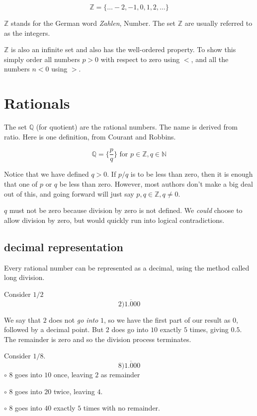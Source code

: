 \documentclass[11pt, oneside]{article}
\begin{document}
\[ \mathbb{Z} = \{ \dots -2, -1, 0, 1, 2, \dots \} \]

$\mathbb{Z}$ stands for the German word \emph{Zahlen}, Number.  The set $\mathbb{Z}$ are usually referred to as the integers.

$\mathbb{Z}$ is also an infinite set and also has the well-ordered property.  To show this simply order all numbers $p > 0$ with respect to zero using $<$, and all the numbers $n < 0$ using $>$.

\section*{Rationals}

The set $\mathbb{Q}$ (for quotient) are the rational numbers.  The name is derived from ratio.  Here is one definition, from Courant and Robbins.

\[ \mathbb{Q} = \{ \frac{p}{q} \} \text{ for } p \in \mathbb{Z}, q \in \mathbb{N} \]

Notice that we have defined $q > 0$.  If $p/q$ is to be less than zero, then it is enough that one of $p$ or $q$ be less than zero.  However, most authors don't make a big deal out of this, and going forward will just say $p,q \in \mathbb{Z}, q \ne 0$.  

$q$ must not be zero because division by zero is not defined.  We \emph{could} choose to allow division by zero, but would quickly run into logical contradictions.

\subsection*{decimal representation}

Every rational number can be represented as a decimal, using the method called long division.

Consider $1/2$
\[ 2 \overline{)1.000} \]

We say that $2$ does not \emph{go into} $1$, so we have the first part of our result as $0$, followed by a decimal point.  But $2$ does go into $10$ exactly $5$ times, giving $0.5$.  The remainder is zero and so the division process terminates.

Consider $1/8$.
\[ 8 \overline{)1.000} \]
$\circ$  $8$ goes into $10$ once, leaving $2$ as remainder

$\circ$  $8$ goes into $20$ twice, leaving $4$.  

$\circ$  $8$ goes into $40$ exactly $5$ times with no remainder.
\end{document}
